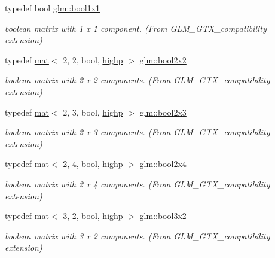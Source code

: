 \begin{DoxyCompactItemize}
typedef bool \mbox{\hyperlink{group__gtx__compatibility_ga98d9d3da22aebc872ba38ce5afa0eff7}{glm\+::bool1x1}}
\begin{DoxyCompactList}\small\item\em boolean matrix with 1 x 1 component. (From G\+L\+M\+\_\+\+G\+T\+X\+\_\+compatibility extension) \end{DoxyCompactList}\item 
typedef \mbox{\hyperlink{structglm_1_1mat}{mat}}$<$ 2, 2, bool, \mbox{\hyperlink{namespaceglm_a36ed105b07c7746804d7fdc7cc90ff25ac6f7eab42eacbb10d59a58e95e362074}{highp}} $>$ \mbox{\hyperlink{group__gtx__compatibility_ga1a3707855138ba2d14b7f2ccfb93f476}{glm\+::bool2x2}}
\begin{DoxyCompactList}\small\item\em boolean matrix with 2 x 2 components. (From G\+L\+M\+\_\+\+G\+T\+X\+\_\+compatibility extension) \end{DoxyCompactList}\item 
typedef \mbox{\hyperlink{structglm_1_1mat}{mat}}$<$ 2, 3, bool, \mbox{\hyperlink{namespaceglm_a36ed105b07c7746804d7fdc7cc90ff25ac6f7eab42eacbb10d59a58e95e362074}{highp}} $>$ \mbox{\hyperlink{group__gtx__compatibility_gabbcc655d12f2f13ddc1917414389e8e1}{glm\+::bool2x3}}
\begin{DoxyCompactList}\small\item\em boolean matrix with 2 x 3 components. (From G\+L\+M\+\_\+\+G\+T\+X\+\_\+compatibility extension) \end{DoxyCompactList}\item 
typedef \mbox{\hyperlink{structglm_1_1mat}{mat}}$<$ 2, 4, bool, \mbox{\hyperlink{namespaceglm_a36ed105b07c7746804d7fdc7cc90ff25ac6f7eab42eacbb10d59a58e95e362074}{highp}} $>$ \mbox{\hyperlink{group__gtx__compatibility_gaa709e6df01dc0ae495c0b5c901a0a181}{glm\+::bool2x4}}
\begin{DoxyCompactList}\small\item\em boolean matrix with 2 x 4 components. (From G\+L\+M\+\_\+\+G\+T\+X\+\_\+compatibility extension) \end{DoxyCompactList}\item 
typedef \mbox{\hyperlink{structglm_1_1mat}{mat}}$<$ 3, 2, bool, \mbox{\hyperlink{namespaceglm_a36ed105b07c7746804d7fdc7cc90ff25ac6f7eab42eacbb10d59a58e95e362074}{highp}} $>$ \mbox{\hyperlink{group__gtx__compatibility_ga24674530ea1f5c4e78ba3932dcd7504a}{glm\+::bool3x2}}
\begin{DoxyCompactList}\small\item\em boolean matrix with 3 x 2 components. (From G\+L\+M\+\_\+\+G\+T\+X\+\_\+compatibility extension) \end{DoxyCompactList}\item 

\end{DoxyCompactItemize}
